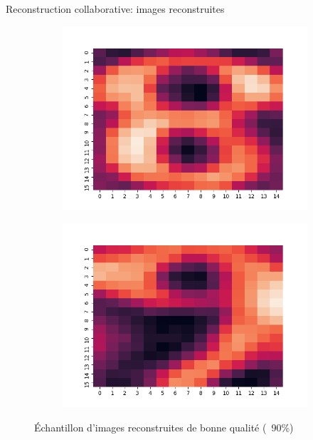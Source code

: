 \documentclass[hyperref={pdfpagelabels=false}]{beamer}
\begin{document}
\begin{frame}{Reconstruction collaborative: images reconstruites}
\begin{figure}[h]
\begin{subfigure}[c]{0.18\textwidth}
                \includegraphics[scale=.12]{8}
            \end{subfigure}
            \begin{subfigure}[c]{0.18\textwidth}
                \includegraphics[scale=.12]{9}
            \end{subfigure}
            \caption{Échantillon d'images reconstruites de bonne qualité 
            (~90\%)}
        \end{figure}
    \end{frame}
\end{document}
